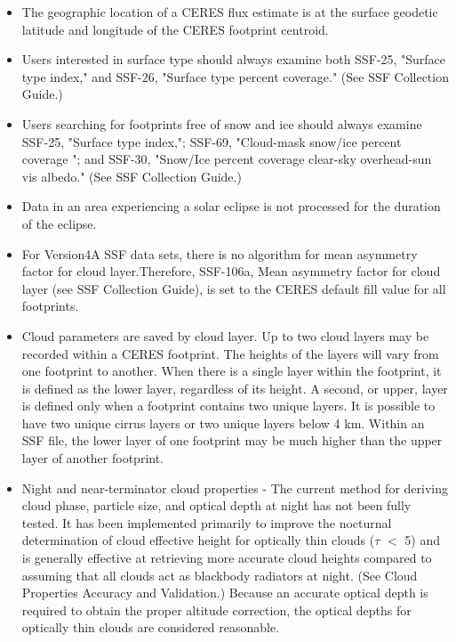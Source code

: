 \documentclass[12pt]{article}
\begin{document}
\begin{itemize}
	\item The geographic location of a CERES flux estimate is at the surface geodetic latitude and 		longitude of the CERES footprint centroid.
	
	\item Users interested in surface type should always examine both SSF-25, "Surface type 		index," and SSF-26, "Surface type percent coverage." (See SSF Collection Guide.)
	
	\item Users searching for footprints free of snow and ice should always examine SSF-25, "Surface type index,"; SSF-69, "Cloud-mask snow/ice percent coverage "; and SSF-30, "Snow/Ice percent coverage clear-sky overhead-sun vis albedo." (See SSF Collection Guide.)
	
	\item Data in an area experiencing a solar eclipse is not processed for the duration of the
	 eclipse.
	 
	 \item  For  Version4A SSF data sets, there is no algorithm for mean asymmetry factor for cloud layer.Therefore, SSF-106a, Mean asymmetry factor for cloud layer (see SSF Collection Guide), is set to the CERES default fill value for all footprints. 
	 
	 \item Cloud parameters are saved by cloud layer. Up to two cloud layers may be recorded within a CERES footprint. The heights of the layers will vary from one footprint to another. When there is a single layer within the footprint, it is defined as the lower layer, regardless of its height. A second, or upper, layer is defined only when a footprint contains two unique layers. It is possible to have two unique cirrus layers or two unique layers below 4 km. Within an SSF file, the lower layer of one footprint may be much higher than the upper layer of another footprint.
	 
	 \item Night and near-terminator cloud properties - The current method for deriving cloud phase, particle size, and optical depth at night has not been fully tested. It has been implemented primarily to improve the nocturnal determination of cloud effective height for optically thin clouds ($\tau$ $<$  5) and is generally effective at retrieving more accurate cloud heights compared to assuming that all clouds act as blackbody radiators at night. (See Cloud Properties Accuracy and Validation.) Because an accurate optical depth is required to obtain the proper altitude correction, the optical depths for optically thin clouds are considered reasonable.
	 

\end{itemize}
\end{document}
